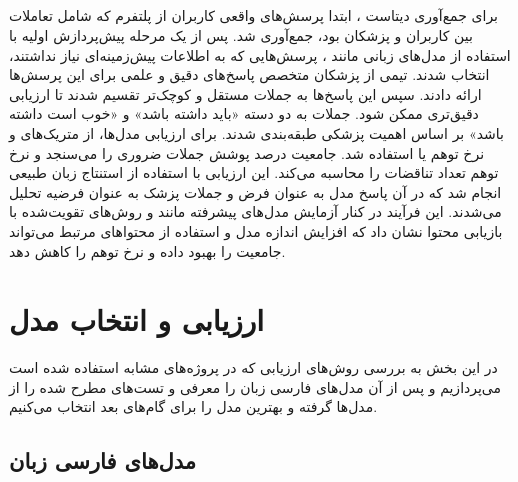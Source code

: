\documentclass[11pt, a4paper, oneside]{book}
\begin{document}
		\section{}
			برای جمع‌آوری دیتاست ، ابتدا پرسش‌های واقعی کاربران از پلتفرم  که شامل تعاملات بین کاربران و پزشکان بود، جمع‌آوری شد. پس از یک مرحله پیش‌پردازش اولیه با استفاده از مدل‌های زبانی مانند ، پرسش‌هایی که به اطلاعات پیش‌زمینه‌ای نیاز نداشتند، انتخاب شدند. تیمی از پزشکان متخصص پاسخ‌های دقیق و علمی برای این پرسش‌ها ارائه دادند. سپس این پاسخ‌ها به جملات مستقل و کوچک‌تر تقسیم شدند تا ارزیابی دقیق‌تری ممکن شود. جملات به دو دسته «باید داشته باشد» و «خوب است داشته باشد» بر اساس اهمیت پزشکی طبقه‌بندی شدند. برای ارزیابی مدل‌ها، از متریک‌های  و نرخ توهم یا  استفاده شد. جامعیت درصد پوشش جملات ضروری را می‌سنجد و نرخ توهم تعداد تناقضات را محاسبه می‌کند. این ارزیابی با استفاده از استنتاج زبان طبیعی انجام شد که در آن پاسخ مدل به عنوان فرض و جملات پزشک به عنوان فرضیه تحلیل می‌شدند. این فرآیند در کنار آزمایش مدل‌های پیشرفته مانند  و روش‌های تقویت‌شده با بازیابی محتوا نشان داد که افزایش اندازه مدل و استفاده از محتواهای مرتبط می‌تواند جامعیت را بهبود داده و نرخ توهم را کاهش دهد. \cite{manes_k-qa_2024}

		
	\chapter{ارزیابی و انتخاب مدل}
		
		در این بخش به بررسی روش‌های ارزیابی که در پروژه‌های مشابه استفاده شده است می‌پردازیم و پس از آن مدل‌های فارسی زبان را معرفی و تست‌های مطرح شده را از مدل‌ها گرفته و بهترین مدل را برای گام‌های بعد انتخاب می‌کنیم.
		
		
		\section{مدل‌های فارسی زبان} \label{persian_llms}
		
			\subsection{} \label{aya-23-8B}
			
\end{document}
